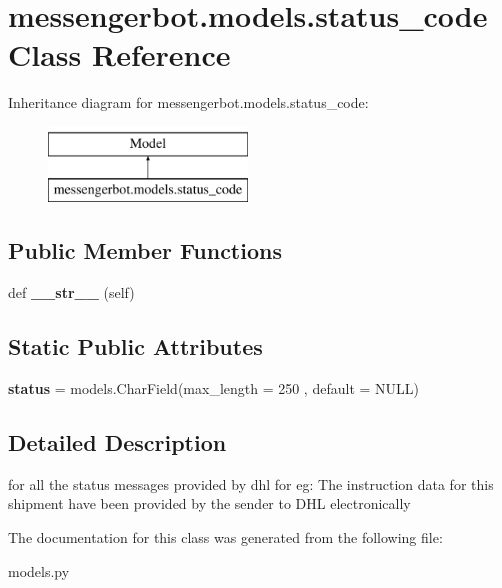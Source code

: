 \hypertarget{classmessengerbot_1_1models_1_1status__code}{}\section{messengerbot.\+models.\+status\+\_\+code Class Reference}
\label{classmessengerbot_1_1models_1_1status__code}
Inheritance diagram for messengerbot.\+models.\+status\+\_\+code\+:\begin{figure}[H]
\begin{center}
\leavevmode
\includegraphics[height=2.000000cm]{classmessengerbot_1_1models_1_1status__code}
\end{center}
\end{figure}
\subsection*{Public Member Functions}
\begin{DoxyCompactItemize}
\item 
\mbox{\label{classmessengerbot_1_1models_1_1status__code_a26cab58d40b51e434242f6a324e0247c}} 
def {\bfseries \+\_\+\+\_\+str\+\_\+\+\_\+} (self)
\end{DoxyCompactItemize}
\subsection*{Static Public Attributes}
\begin{DoxyCompactItemize}
\item 
\mbox{\label{classmessengerbot_1_1models_1_1status__code_a61285a10b7a60b3a8f87504194bea9f5}} 
{\bfseries status} = models.\+Char\+Field(max\+\_\+length = 250 , default = \textquotesingle{}N\+U\+LL\textquotesingle{})
\end{DoxyCompactItemize}


\subsection{Detailed Description}
\begin{DoxyVerb}for all the status messages provided by dhl for eg: The instruction data for this shipment have been provided by the sender to DHL electronically\end{DoxyVerb}
 

The documentation for this class was generated from the following file\+:\begin{DoxyCompactItemize}
\item 
models.\+py\end{DoxyCompactItemize}
